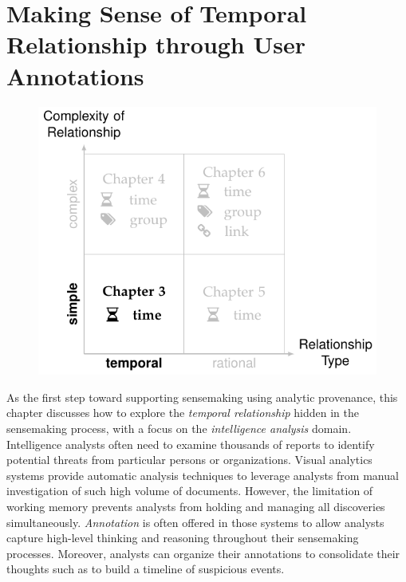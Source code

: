 \chapter{Making Sense of Temporal Relationship through User Annotations}
\label{chap:schemaline}

\graphicspath{{Chapter3/figures/}}

\begin{figure}[!htb]
	\centering
	\includegraphics{work-ch3}
\end{figure}

\vspace{1in}

		
\pagebreak
As the first step toward supporting sensemaking using analytic provenance, this chapter discusses how to explore the \emph{temporal relationship} hidden in the sensemaking process, with a focus on the \emph{intelligence analysis} domain. Intelligence analysts often need to examine thousands of reports to identify potential threats from particular persons or organizations. Visual analytics systems provide automatic analysis techniques to leverage analysts from manual investigation of such high volume of documents. However, the limitation of working memory prevents analysts from holding and managing all discoveries simultaneously. \emph{Annotation} is often offered in those systems to allow analysts capture high-level thinking and reasoning throughout their sensemaking processes. Moreover, analysts can organize their annotations to consolidate their thoughts such as to build a timeline of suspicious events.

